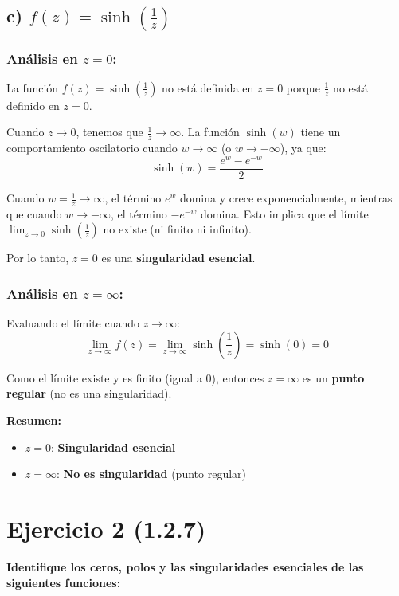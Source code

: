 \documentclass{article}
\begin{document}
\subsection*{c) $f(z) = \sinh\left(\frac{1}{z}\right)$}

\subsubsection*{Análisis en $z = 0$:}

La función $f(z) = \sinh\left(\frac{1}{z}\right)$ no está definida en $z = 0$ porque $\frac{1}{z}$ no está definido en $z = 0$.

Cuando $z \to 0$, tenemos que $\frac{1}{z} \to \infty$. La función $\sinh(w)$ tiene un comportamiento oscilatorio cuando $w \to \infty$ (o $w \to -\infty$), ya que:
$$\sinh(w) = \frac{e^w - e^{-w}}{2}$$

Cuando $w = \frac{1}{z} \to \infty$, el término $e^w$ domina y crece exponencialmente, mientras que cuando $w \to -\infty$, el término $-e^{-w}$ domina. Esto implica que el límite $\lim_{z \to 0} \sinh\left(\frac{1}{z}\right)$ no existe (ni finito ni infinito).

Por lo tanto, $z = 0$ es una \textbf{singularidad esencial}.

\subsubsection*{Análisis en $z = \infty$:}

Evaluando el límite cuando $z \to \infty$:
$$\lim_{z \to \infty} f(z) = \lim_{z \to \infty} \sinh\left(\frac{1}{z}\right) = \sinh(0) = 0$$

Como el límite existe y es finito (igual a 0), entonces $z = \infty$ es un \textbf{punto regular} (no es una singularidad).

\textbf{Resumen:}
\begin{itemize}
\item $z = 0$: \textbf{Singularidad esencial}
\item $z = \infty$: \textbf{No es singularidad} (punto regular)
\end{itemize}

\newpage
\section*{Ejercicio 2 (1.2.7)}

\textbf{Identifique los ceros, polos y las singularidades esenciales de las siguientes funciones:}
\end{document}
